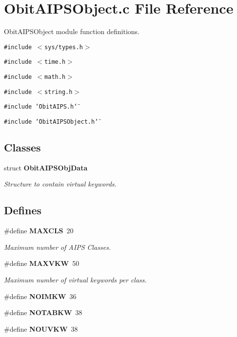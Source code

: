 \section{Obit\-AIPSObject.c File Reference}
\label{ObitAIPSObject_8c}
Obit\-AIPSObject module function definitions. 

{\tt \#include $<$sys/types.h$>$}\par
{\tt \#include $<$time.h$>$}\par
{\tt \#include $<$math.h$>$}\par
{\tt \#include $<$string.h$>$}\par
{\tt \#include \char`\"{}Obit\-AIPS.h\char`\"{}}\par
{\tt \#include \char`\"{}Obit\-AIPSObject.h\char`\"{}}\par
\subsection*{Classes}
\begin{CompactItemize}
\item 
struct {\bf Obit\-AIPSObj\-Data}
\begin{CompactList}\small\item\em Structure to contain virtual keywords. \item\end{CompactList}\end{CompactItemize}
\subsection*{Defines}
\begin{CompactItemize}
\item 
\#define {\bf MAXCLS}\ 20
\begin{CompactList}\small\item\em Maximum number of AIPS Classes. \item\end{CompactList}\item 
\#define {\bf MAXVKW}\ 50
\begin{CompactList}\small\item\em Maximum number of virtual keywords per class. \item\end{CompactList}\item 
\#define {\bf NOIMKW}\ 36
\item 
\#define {\bf NOTABKW}\ 38
\item 
\#define {\bf NOUVKW}\ 38
\end{CompactItemize}
